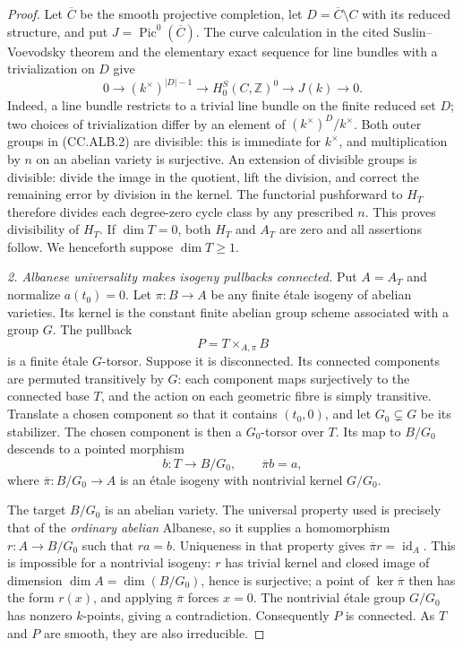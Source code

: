 \documentclass[11pt,a4paper]{article}
\theoremstyle{definition}\newtheorem{definition}[theorem]{Definition}
\theoremstyle{remark}\newtheorem{remark}[theorem]{Remark}
\begin{document}
\begin{proof}
Let $\overline C$ be the smooth projective completion,
let $D=\overline C\setminus C$ with its reduced structure,
and put $J=\operatorname{Pic}^0(\overline C)$.
The curve calculation in the cited Suslin--Voevodsky
theorem and the elementary exact sequence for line
bundles with a trivialization on $D$ give
\[
 0\longrightarrow (k^\times)^{|D|-1}
 \longrightarrow H^S_0(C,\mathbb Z)^0
 \longrightarrow J(k)\longrightarrow0.             \tag{CC.ALB.2}
\]
Indeed, a line bundle restricts to a trivial line bundle
on the finite reduced set $D$; two choices of
trivialization differ by an element of
$(k^\times)^D/k^\times$.
Both outer groups in (CC.ALB.2) are divisible:
this is immediate for $k^\times$, and multiplication
by $n$ on an abelian variety is surjective.
An extension of divisible groups is divisible: divide
the image in the quotient, lift the division, and
correct the remaining error by division in the kernel.
The functorial pushforward to $H_T$ therefore divides
each degree-zero cycle class by any prescribed $n$.
This proves divisibility of $H_T$.  If $\dim T=0$,
both $H_T$ and $A_T$ are zero and all assertions follow.
We henceforth suppose $\dim T\geq1$.

\emph{2. Albanese universality makes isogeny pullbacks
connected.}
Put $A=A_T$ and normalize $a(t_0)=0$.
Let $\pi:B\to A$ be any finite \'{e}tale isogeny of
abelian varieties.  Its kernel is the constant finite
abelian group scheme associated with a group $G$.
The pullback
\[
 P=T\times_{A,\pi}B
\]
is a finite \'{e}tale $G$-torsor.
Suppose it is disconnected.  Its connected components
are permuted transitively by $G$: each component maps
surjectively to the connected base $T$, and the action
on each geometric fibre is simply transitive.
Translate a chosen component so that it contains
$(t_0,0)$, and let $G_0\subsetneq G$ be its stabilizer.
The chosen component is then a $G_0$-torsor over $T$.
Its map to $B/G_0$ descends to a pointed morphism
\[
 b:T\longrightarrow B/G_0,\qquad \overline\pi b=a,
\]
where $\overline\pi:B/G_0\to A$ is an \'{e}tale isogeny
with nontrivial kernel $G/G_0$.

The target $B/G_0$ is an abelian variety.
The universal property used is precisely that of the
\emph{ordinary abelian} Albanese, so it supplies a
homomorphism $r:A\to B/G_0$ such that $ra=b$.
Uniqueness in that property gives
$\overline\pi r=\operatorname{id}_A$.
This is impossible for a nontrivial isogeny:
$r$ has trivial kernel and closed image of dimension
$\dim A=\dim(B/G_0)$, hence is surjective;
a point of $\ker\overline\pi$ then has the form $r(x)$,
and applying $\overline\pi$ forces $x=0$.
The nontrivial \'{e}tale group $G/G_0$ has nonzero
$k$-points, giving a contradiction.
Consequently $P$ is connected.
As $T$ and $P$ are smooth, they are also irreducible.


\end{proof}
\end{document}
